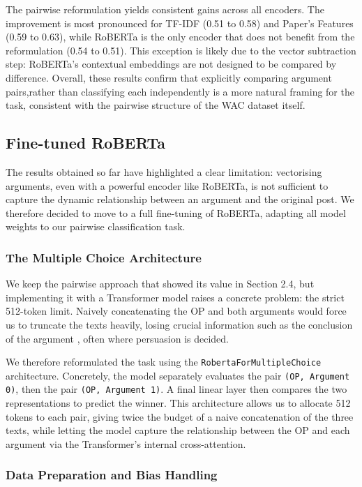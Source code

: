 \documentclass[11pt,a4paper]{article}
\begin{document}
The pairwise reformulation yields consistent gains across all encoders. The improvement is most pronounced for TF-IDF (0.51 to 0.58) 
and Paper's Features (0.59 to 0.63), while RoBERTa is the only encoder 
that does not benefit from the reformulation (0.54 to 0.51). This exception 
is likely due to the vector subtraction step: RoBERTa's contextual 
embeddings are not designed to be compared by difference. Overall, these results confirm that explicitly comparing argument pairs,rather than classifying each 
independently is a more natural framing for the task, consistent with 
the pairwise structure of the WAC dataset itself.

\subsection{Fine-tuned RoBERTa}

The results obtained so far have highlighted a clear limitation: vectorising
arguments, even with a powerful encoder like RoBERTa, is not sufficient to
capture the dynamic relationship between an argument and the original post.
We therefore decided to move to a full fine-tuning of RoBERTa, adapting all
model weights to our pairwise classification task.

\subsubsection{The Multiple Choice Architecture}

We keep the pairwise approach that showed its value in Section 2.4, but
implementing it with a Transformer model raises a concrete problem: the strict
512-token limit. Naively concatenating the OP and both arguments would force
us to truncate the texts heavily, losing crucial information such as the
conclusion of the argument , often where persuasion is decided.

We therefore reformulated the task using the \texttt{RobertaForMultipleChoice}
architecture. Concretely, the model separately evaluates the pair
\texttt{(OP, Argument 0)}, then the pair
\texttt{(OP, Argument 1)}. A final linear layer then compares
the two representations to predict the winner. This architecture allows us to
allocate 512 tokens to each pair, giving twice the budget of a naive
concatenation of the three texts, while letting the model capture the
relationship between the OP and each argument via the Transformer's internal
cross-attention.

\subsubsection{Data Preparation and Bias Handling}
\end{document}
